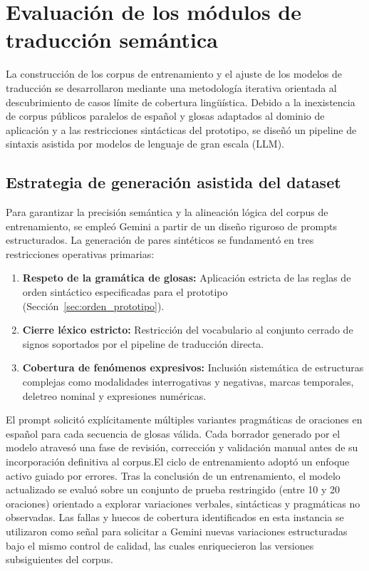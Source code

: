 \section{Evaluación de los módulos de traducción semántica}
La construcción de los corpus de entrenamiento y el ajuste de los modelos de traducción se desarrollaron mediante una metodología iterativa orientada al descubrimiento de casos límite de cobertura lingüística. Debido a la inexistencia de corpus públicos paralelos de español y glosas adaptados al dominio de aplicación y a las restricciones sintácticas del prototipo, se diseñó un pipeline de sintaxis asistida por modelos de lenguaje de gran escala (LLM).

\subsection{Estrategia de generación asistida del dataset}
\label{sec:estrategia_dataset}
Para garantizar la precisión semántica y la alineación lógica del corpus de entrenamiento, se empleó Gemini a partir de un diseño riguroso de prompts estructurados. La generación de pares sintéticos se fundamentó en tres restricciones operativas primarias:
\begin{enumerate}
    \item \textbf{Respeto de la gramática de glosas:} Aplicación estricta de las reglas de orden sintáctico especificadas para el prototipo (Sección~\ref{sec:orden_prototipo}).
    \item \textbf{Cierre léxico estricto:} Restricción del vocabulario al conjunto cerrado de signos soportados por el pipeline de traducción directa.
    \item \textbf{Cobertura de fenómenos expresivos:} Inclusión sistemática de estructuras complejas como modalidades interrogativas y negativas, marcas temporales, deletreo nominal y expresiones numéricas.
\end{enumerate}

El prompt solicitó explícitamente múltiples variantes pragmáticas de oraciones en español para cada secuencia de glosas válida. Cada borrador generado por el modelo atravesó una fase de revisión, corrección y validación manual antes de su incorporación definitiva al corpus.El ciclo de entrenamiento adoptó un enfoque activo guiado por errores. Tras la conclusión de un entrenamiento, el modelo actualizado se evaluó sobre un conjunto de prueba restringido (entre 10 y 20 oraciones) orientado a explorar variaciones verbales, sintácticas y pragmáticas no observadas. Las fallas y huecos de cobertura identificados en esta instancia se utilizaron como señal para solicitar a Gemini nuevas variaciones estructuradas bajo el mismo control de calidad, las cuales enriquecieron las versiones subsiguientes del corpus.

